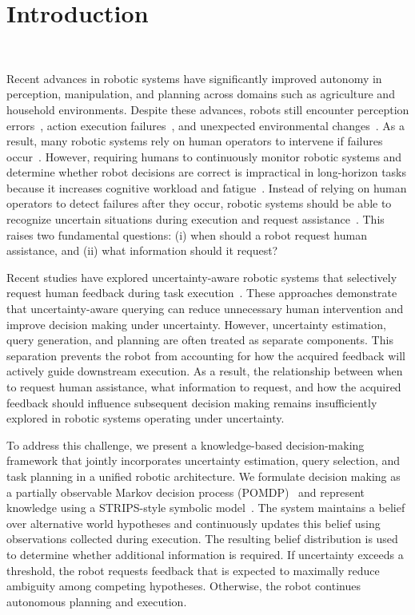 \section{Introduction}~\label{intro}

Recent advances in robotic systems have significantly improved autonomy in perception, manipulation, and planning across domains such as agriculture and household environments. Despite these advances, robots still encounter perception errors~\cite{kaipa2016addressing}, action execution failures~\cite{kaelbling1998planning}, and unexpected environmental changes~\cite{kurniawati2016online}. As a result, many robotic systems rely on human operators to intervene if failures occur~\cite{dragan2013legibility, goodrich2008human}. However, requiring humans to continuously monitor robotic systems and determine whether robot decisions are correct is impractical in long-horizon tasks because it increases cognitive workload and fatigue~\cite{chen2014human}. Instead of relying on human operators to detect failures after they occur, robotic systems should be able to recognize uncertain situations during execution and request assistance~\cite{sadigh2017active, leusmann2023understanding}. This raises two fundamental questions: (i) when should a robot request human assistance, and (ii) what information should it request?


Recent studies have explored uncertainty-aware robotic systems that selectively request human feedback during task execution~\cite{ren2023robots, liang2024introspective, mullen2025lbap}. These approaches demonstrate that uncertainty-aware querying can reduce unnecessary human intervention and improve decision making under uncertainty. However, uncertainty estimation, query generation, and planning are often treated as separate components. This separation prevents the robot from accounting for how the acquired feedback will actively guide downstream execution. As a result, the relationship between when to request human assistance, what information to request, and how the acquired feedback should influence subsequent decision making remains insufficiently explored in robotic systems operating under uncertainty.


To address this challenge, we present a knowledge-based decision-making framework that jointly incorporates uncertainty estimation, query selection, and task planning in a unified robotic architecture. We formulate decision making as a partially observable Markov decision process (POMDP)~\cite{kaelbling1998planning} and represent knowledge using a STRIPS-style symbolic model~\cite{davis1993knowledge,fikes1971strips}. The system maintains a belief over alternative world hypotheses and continuously updates this belief using observations collected during execution. The resulting belief distribution is used to determine whether additional information is required. If uncertainty exceeds a threshold, the robot requests feedback that is expected to maximally reduce ambiguity among competing hypotheses. Otherwise, the robot continues autonomous planning and execution.



